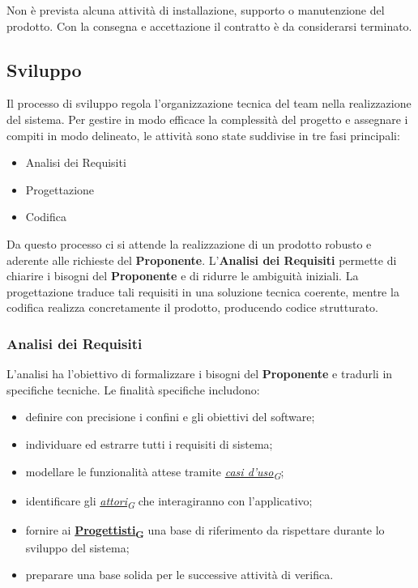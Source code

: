 \documentclass[12pt, a4paper]{article}
\newcommand{\urlglossario}{https://skynetunigroup.github.io/Code_Guardian/Documentazione/RTB/glossario_v1.0.0.pdf} %
\newcommand{\glo}[2]{\href{\urlglossario\#nameddest=#2}{#1\textsubscript{G}}}
\begin{document}
Non è prevista alcuna attività di installazione, supporto o manutenzione del prodotto. Con la consegna e accettazione il contratto è da considerarsi terminato.

\subsection{Sviluppo}

Il processo di sviluppo regola l'organizzazione tecnica del team nella realizzazione del sistema. Per gestire in modo efficace la complessità del progetto e assegnare i compiti in modo delineato, le attività sono state suddivise in tre fasi principali:
\begin{itemize}
    \item Analisi dei Requisiti
    \item Progettazione
    \item Codifica
\end{itemize}

Da questo processo ci si attende la realizzazione di un prodotto robusto e aderente alle richieste del \textbf{Proponente}. L'\textbf{Analisi dei Requisiti} permette di chiarire i bisogni del \textbf{Proponente} e di ridurre le ambiguità iniziali. La progettazione traduce tali requisiti in una soluzione tecnica coerente, mentre la codifica realizza concretamente il prodotto, producendo codice strutturato.

\subsubsection{Analisi dei Requisiti}

L'analisi ha l'obiettivo di formalizzare i bisogni del \textbf{Proponente} e tradurli in specifiche tecniche. Le finalità specifiche includono:
\begin{itemize}
    \item definire con precisione i confini e gli obiettivi del software;
    \item individuare ed estrarre tutti i requisiti di sistema;
    \item modellare le funzionalità attese tramite \textit{\glo{casi d'uso}{use-case}};
    \item identificare gli \textit{\glo{attori}{attore}} che interagiranno con l'applicativo;
    \item fornire ai \textbf{\glo{Progettisti}{progettista}} una base di riferimento da rispettare durante lo sviluppo del sistema;
    \item preparare una base solida per le successive attività di verifica.
\end{itemize}
\end{document}
